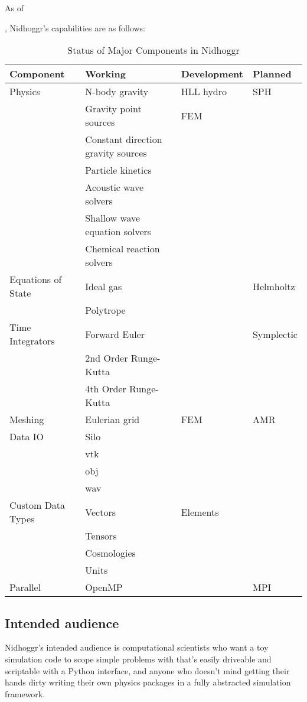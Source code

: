 \documentclass[12pt]{article}
\begin{document}
As of \date{\today}, Nidhoggr's capabilities are as follows:
\begin{table}[h!]
	\centering
	\begin{tabular}{|l|l|l|l|}
		\hline
		\textbf{Component} & \textbf{Working} & \textbf{Development} & \textbf{Planned} \\
		\hline
		Physics & N-body gravity & HLL hydro & SPH\\ 
		& Gravity point sources & FEM &\\
		& Constant direction gravity sources &  &\\
		& Particle kinetics &  &\\
		& Acoustic wave solvers &  &\\
		& Shallow wave equation solvers &  &\\
		& Chemical reaction solvers &  &\\
		\hline
		Equations of State & Ideal gas &  & Helmholtz\\ 
		& Polytrope &  &\\
		\hline
		Time Integrators & Forward Euler &  & Symplectic\\ 
		& 2nd Order Runge-Kutta &  &\\
		& 4th Order Runge-Kutta &  &\\
		\hline
		Meshing & Eulerian grid & FEM & AMR\\
		\hline
		Data IO & Silo &  &\\
		& vtk &  &\\
		& obj &  &\\
		& wav &  &\\
		\hline
		Custom Data Types & Vectors & Elements &\\
		& Tensors &  &\\
		& Cosmologies & & \\
		& Units & & \\
		\hline
		Parallel & OpenMP & & MPI \\
		\hline
	\end{tabular}
	\caption{Status of Major Components in Nidhoggr}
	\label{tab:component-status}
\end{table}
	
	\subsection{Intended audience}
	
Nidhoggr's intended audience is computational scientists who want a toy simulation code to scope simple problems with that's easily driveable and scriptable with a Python interface, and anyone who doesn't mind getting their hands dirty writing their own physics packages in a fully abstracted simulation framework. 
\end{document}
